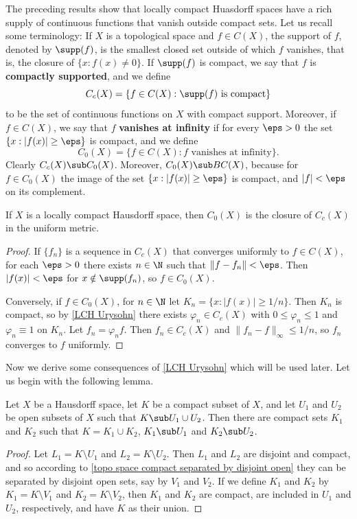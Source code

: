 The preceding results show that locally compact Huasdorff spaces have a rich supply of continuous functions that vanish outside compact sets. Let us recall some terminology: If $X$ is a topological space and $f\in C(X)$, the support of $f$, denoted by $\supp(f)$, is the smallest closed set outside of which $f$ vanishes, that is, the closure of $\{x:f(x)\neq 0\}$. If $\supp(f)$ is compact, we say that $f$ is \textbf{compactly supported}, and we define
\[C_c(X)=\{f\in C(X):\text{$\supp(f)$ is compact}\}\]
to be the set of continuous functions on $X$ with compact support. Moreover, if $f\in C(X)$, we say that $f$ \textbf{vanishes at infinity} if for every $\eps>0$ the set $\{x:|f(x)|\geq\eps\}$ is compact, and we define
\[C_0(X)=\{f\in C(X):\text{$f$ vanishes at infinity}\}.\]
Clearly $C_c(X)\sub C_0(X)$. Moreover, $C_0(X)\sub BC(X)$, because for $f\in C_0(X)$ the image of the set $\{x:|f(x)|\geq\eps\}$ is compact, and $|f|<\eps$ on its complement.
\begin{proposition}\label{LCH C_0(X) is closure of C_c(X)}
If $X$ is a locally compact Hausdorff space, then $C_0(X)$ is the closure of $C_c(X)$ in the uniform metric.
\end{proposition}
\begin{proof}
If $\{f_n\}$ is a sequence in $C_c(X)$ that converges uniformly to $f\in C(X)$, for each $\eps>0$ there exists $n\in\N$ such that $\|f-f_n\|<\eps$. Then $|f(x)|<\eps$ for $x\notin\supp(f_n)$, so $f\in C_0(X)$.\par
Conversely, if $f\in C_0(X)$, for $n\in\N$ let $K_n=\{x:|f(x)|\geq 1/n\}$. Then $K_n$ is compact, so by \cref{LCH Urysohn} there exists $\varphi_n\in C_c(X)$ with $0\leq\varphi_n\leq 1$ and $\varphi_n\equiv 1$ on $K_n$. Let $f_n=\varphi_nf$. Then $f_n\in C_c(X)$ and $\|f_n-f\|_{\infty}\leq 1/n$, so $f_n$ converges to $f$ uniformly.
\end{proof}
Now we derive some consequences of \cref{LCH Urysohn} which will be used later. Let us begin with the following lemma.
\begin{lemma}\label{compact set separated by open union}
Let $X$ be a Hausdorff space, let $K$ be a compact subset of $X$, and let $U_1$ and $U_2$ be open subsets of $X$ such that $K\sub U_1\cup U_2$. Then there are compact sets $K_1$ and $K_2$ such that $K=K_1\cup K_2$, $K_1\sub U_1$ and $K_2\sub U_2$.
\end{lemma}
\begin{proof}
Let $L_1=K\setminus U_1$ and $L_2=K\setminus U_2$. Then $L_1$ and $L_2$ are disjoint and compact, and so according to \cref{topo space compact separated by disjoint open} they can be separated by disjoint open sets, say by $V_1$ and $V_2$. If we define $K_1$ and $K_2$ by $K_1=K\setminus V_1$ and $K_2=K\setminus V_2$, then $K_1$ and $K_2$ are compact, are included in $U_1$ and $U_2$, respectively, and have $K$ as their union.
\end{proof}
